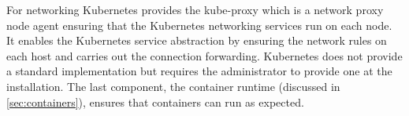 For networking Kubernetes provides the kube-proxy which is a network proxy node agent ensuring that the Kubernetes networking services run on each node. It enables the Kubernetes service abstraction by ensuring the network rules on each host and carries out the connection forwarding. Kubernetes does not provide a standard implementation but requires the administrator to provide one at the installation. The last component, the container runtime (discussed in \cref{sec:containers}), ensures that containers can run as expected.\\[5mm]